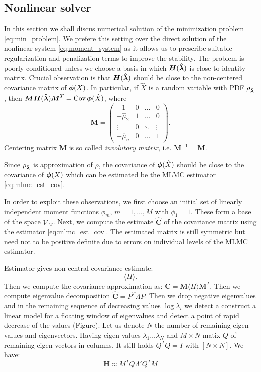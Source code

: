 \documentclass{article}
\def\tn#1{\boldsymbol{#1}}
\def\avg#1{\langle#1\rangle}
\def\Cov{\mathop{\rm Cov}}
\begin{document}
\subsection{Nonlinear solver}

In this section we shall discus numerical solution of the minimization problem \eqref{eq:min_problem}. We prefere this setting over the direct solution of the nonlinear system \eqref{eq:moment_system} as it allows us to prescribe suitable regularization and penalization terms to improve the stability.
The problem is poorly conditioned unless we choose a basis in which $\tn H(\estvl)$ is close to identity matrix. Crucial observation is that $\tn H(\estvl)$ should be close to the non-centered 
covariance matrix of  $\mathbf{\boldsymbol{\phi}}(X)$. In particular, if $\hat X$ is a random variable with PDF $\rho_{{\mathbf{\boldsymbol{\hat\lambda}}}}$, then $\tn M \tn H(\estvl) \tn M^T = \Cov \vphi(\hat X)$, where 
\[
  \tn M = 
  \begin{pmatrix}
    -1    & 0 &\dots &0\\
    -\hat\mu_2    & 1 &\dots &0\\
    \vdots& 0 &\ddots      &\vdots\\
    -\hat\mu_n    & 0 &\dots &1
  \end{pmatrix}.
\]
Centering matrix $\tn M$ is so called \emph{involutory matrix}, i.e. $\tn M^{-1} = \tn M$.


Since $\rho_{{\mathbf{\boldsymbol{\hat\lambda}}}}$ is approximation of $\rho$, the covariance of $\mathbf{\boldsymbol{\phi}}(\hat X)$ should be close to the covariance of $\mathbf{\boldsymbol{\phi}}(X)$ which can be estimated be the MLMC estimator \eqref{eq:mlmc_est_cov}.

In order to exploit these observations, we first choose an initial set of linearly independent 
moment functions $\phi_m$, $m=1,\dots,M$ with $\phi_1=1$. These form a base of the space $\mathcal V_M$.
Next, we compute the estimate $\hat{\tn C}$ of the covariance matrix using the estimator \eqref{eq:mlmc_est_cov}. The estimated matrix is still symmetric but need not to be positive definite
due to errors on individual levels of the MLMC estimator. 


Estimator gives non-central covariance estimate:
\[
 \avg{H}. 
\]
Then we compute the covariance approximation as: $\hat{\tn C} = \tn M \avg{H} \tn M^T$.
Then we compute eigenvalue decomposition $\hat{\tn C}= P^T \Lambda P$. 
Then we drop negative eigenvalues and in the remaining sequence
of decreasing values $\log \lambda_i$ we detect a construct a linear model for a floating window of eigenvalues and detect a point of rapid decrease of the values (Figure). Let us denote $N$ the number of remaining eigen values and eigenvectors. Having eigen values $\lambda_1 \dots \lambda_N$ and $M\times N$ matix $Q$ of remaining eigen vectors in columns. It still holds $Q^T Q = I$ with $[N\times N]$. 
We have:
\[
   \tn H \approx M^T Q\Lambda' Q^TM
\]
\end{document}
